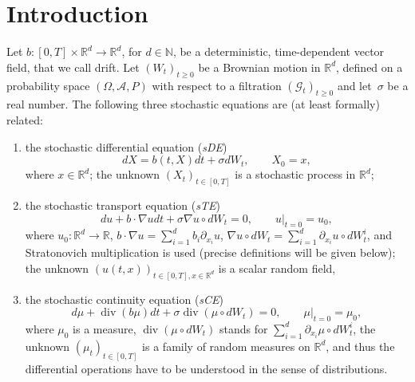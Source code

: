 \documentclass[a4paper,10pt]{article}
\newcommand\1{\mathbbm{1}}
\DeclareMathOperator{\diverg}{div}
\numberwithin{equation}{section}
\begin{document}

\section{Introduction}

Let $b \colon [ 0,T] \times\mathbb{R}^{d}\rightarrow\mathbb{R}^{d}$, for $d \in \mathbb{N}$, be a deterministic, time-dependent vector field, that we call drift. Let $(W_{t}) _{t\geq0}$ be a Brownian motion in $\mathbb{R}^{d}$, defined on a probability space $(\Omega,\mathcal{A},P)$ with respect to a filtration $(\mathcal{G}_{t}) _{t\geq0}$ and let~$\sigma$ be a real number. The following three stochastic equations are (at least formally) related:
\begin{enumerate}
  \item the stochastic differential equation (\textit{sDE}) 
  \begin{equation}
  dX =b(t,X ) dt+\sigma dW_{t},\qquad X_{0}=x , \tag{sDE}
  \label{SDE}
  \end{equation}
  where $x\in\mathbb{R}^{d}$; the unknown $(X_{t}) _{t\in [0,T]}$ is a stochastic process in $\mathbb{R}^{d}$;
  \item the stochastic transport equation (\textit{sTE})
  \begin{equation}
  du+b\cdot\nabla udt+\sigma\nabla u\circ dW_{t}=0,\qquad u|_{t=0}=u_{0} , 
  \tag{sTE}  \label{stoch transport}
  \end{equation}
  where $u_{0} \colon \mathbb{R}^{d}\rightarrow\mathbb{R}$, 
  $b\cdot\nabla u=\sum_{i=1}^{d}b_{i}\partial_{x_{i}}u$, $\nabla u\circ dW_{t}=\sum_{i=1}^{d}\partial_{x_{i}}u\circ dW_{t}^{i}$, and Stratonovich multiplication is used (precise definitions will be given below); the unknown $(u(t,x))_{t\in [ 0,T] ,x\in \mathbb{R}^{d}}$ is a scalar random field,
  \item the stochastic continuity equation (\textit{sCE}) 
  \begin{equation}
  d\mu +\diverg(b\mu) dt+\sigma \diverg 
  (\mu \circ dW_{t}) =0,\qquad\mu|_{t=0}=\mu_{0} , \tag{sCE}
  \label{stoch cont}
  \end{equation}
  where $\mu_{0}$ is a measure, $\diverg (\mu \circ dW_{t})$ stands for $\sum_{i=1}^{d}\partial_{x_{i}}\mu \circ dW_{t}^{i}$, the unknown $(\mu_{t}) _{t\in [ 0,T] }$ is a family of random measures on $\mathbb{R}^{d}$, and thus the differential operations have to be understood in the sense of distributions.
\end{enumerate}
\end{document}
